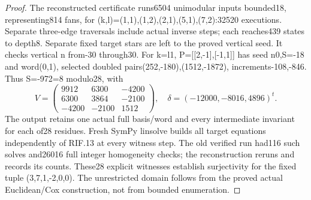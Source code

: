 \begin{proof}
The reconstructed certificate runs6504 unimodular inputs bounded18,
representing814 fans, for (k,l)=(1,1),(1,2),(2,1),(5,1),(7,2):32520
executions. Separate three-edge traversals include actual inverse steps;
each reaches439 states to depth8. Separate fixed target stars are left
to the proved vertical seed. It checks vertical n from-30 through30.
For k=l1, P={[}{[}2,-1{]},{[}-1,1{]}{]} has seed n0,S=-18 and word(0,1),
selected doubled pairs(252,-180),(1512,-1872), increments-108,-846.
Thus S=-972=8 modulo28, with
\[
V=\begin{pmatrix}9912&6300&-4200\\6300&3864&-2100\\-4200&-2100&1512\end{pmatrix},
\quad\delta=(-12000,-8016,4896)^t.\tag{RIF.14}
\]
The output retains one actual full basis/word and every intermediate
invariant for each of28 residues. Fresh SymPy linsolve builds all
target equations independently of RIF.13 at every witness step.
The old verified run had116 such solves and26016 full integer
homogeneity checks; the reconstruction reruns and records its counts.
These28 explicit witnesses establish surjectivity for the fixed tuple
(3,7,1,-2,0,0). The unrestricted domain follows from the proved actual
Euclidean/Cox construction, not from bounded enumeration.

\end{proof}

